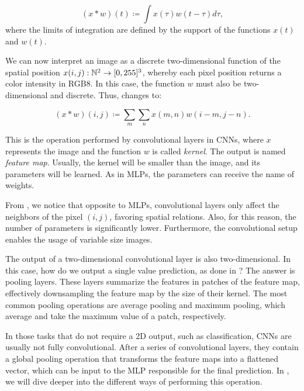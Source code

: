 \begin{equation}
    (x\ast w)(t)\coloneqq \int x(\tau)w(t-\tau)d\tau,
    \label{eq:convolution}
\end{equation}
where the limits of integration are defined by the support of the functions $x(t)$ and $w(t)$. 

We can now interpret an image as a discrete two-dimensional function of the spatial position $x(i,j): \mathbb{N}^2\rightarrow [0, 255]^3$, whereby each pixel position returns a color intensity in RGB8. In this case, the function $w$ must also be two-dimensional and discrete. Thus,  changes to:

\begin{equation}
    (x\ast w)(i,j)\coloneqq \sum_m\sum_n x(m,n) w(i-m, j-n).
    \label{eq:convolution_2d}
\end{equation}

This is the operation performed by convolutional layers in CNNs, where $x$ represents the image and the function $w$ is called \textit{kernel}. The output is named \textit{feature map}. Usually, the kernel will be smaller than the image, and its parameters will be learned. As in MLPs, the parameters can receive the name of weights.

From , we notice that opposite to MLPs, convolutional layers only affect the neighbors of the pixel $(i, j)$, favoring spatial relations. Also, for this reason, the number of parameters is significantly lower. Furthermore, the convolutional setup enables the usage of variable size images. 

The output of a two-dimensional convolutional layer is also two-dimensional. In this case, how do we output a single value prediction, as done in ? The answer is pooling layers. These layers summarize the features in patches of the feature map, effectively downsampling the feature map by the size of their kernel. The most common pooling operations are average pooling and maximum pooling, which average and take the maximum value of a patch, respectively.


In those tasks that do not require a 2D output, such as classification, CNNs are usually not fully convolutional. After a series of convolutional layers, they contain a global pooling operation that transforms the feature maps into a flattened vector, which can be input to the MLP responsible for the final prediction. In , we will dive deeper into the different ways of performing this operation. 

